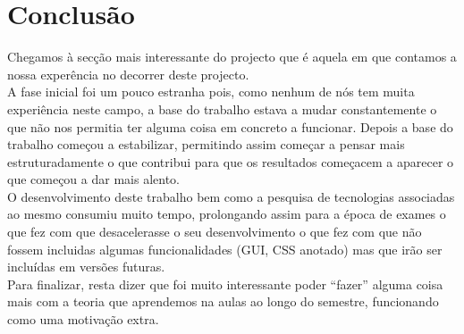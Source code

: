 

\section{Conclusão}
Chegamos à secção mais interessante do projecto que é aquela em que contamos a nossa experência no decorrer deste projecto.\\
A fase inicial foi um pouco estranha pois, como nenhum de nós tem muita experiência neste campo, a base do trabalho estava a mudar constantemente o que não nos permitia ter alguma coisa em concreto a funcionar. Depois a base do trabalho começou a estabilizar, permitindo assim começar a pensar mais estruturadamente o que contribui para que os  resultados começacem a aparecer o que começou a dar mais alento.\\
O desenvolvimento deste trabalho bem como a pesquisa de tecnologias associadas ao mesmo consumiu muito tempo, prolongando assim para a época de exames o que fez com que desacelerasse o seu desenvolvimento o que fez com que não fossem incluidas algumas funcionalidades (GUI, CSS anotado) mas que irão ser incluídas em versões futuras.\\
Para finalizar, resta dizer que foi muito interessante poder ``fazer'' alguma coisa mais com a teoria que aprendemos na aulas ao longo do semestre, funcionando como uma motivação extra. 
